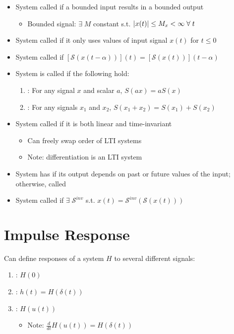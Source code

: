 \documentclass[12pt]{extarticle}
\begin{document}
\newp
\begin{whitebox}
     \begin{itemize}
        \item System called  if a bounded input results in a bounded output \begin{itemize}
            \item Bounded signal: $\exists\;M$ constant s.t. $\left|x(t)\right|\leq M_x<\infty\;\forall\;t$
        \end{itemize}
        \item System called  if it only uses values of input signal $x(t)$ for $t\leq0$
        \item System called  if $[\mathcal{S}(x(t-\alpha))](t)=[\mathcal{S}(x(t))](t-\alpha)$
        \item System is called  if the following hold: \begin{enumerate}
            \item {}: For any signal $x$ and scalar $a$, $S(ax)=aS(x)$
            \item {}: For any signals $x_1$ and $x_2$, $S(x_1+x_2)=S(x_1)+S(x_2)$
        \end{enumerate}
        \item System called  if it is both linear and time-invariant \begin{itemize}
            \item Can freely swap order of LTI systems
            \item Note: differentiation is an LTI system
        \end{itemize}
        \item System has  if its output depends on past or future values of the input; otherwise, called 
        \item System called  if $\exists\;\mathcal{S}^{inv}$ s.t. $x(t)=\mathcal{S}^{inv}(\mathcal{S}(x(t)))$
    \end{itemize}
\end{whitebox}


\pagebreak
\section{Impulse Response}
Can define responses of a system $H$ to several different signals: \begin{enumerate}
    \item {}: $H(0)$
    \item {}: $h(t)=H(\delta(t))$
    \item {}: $H(u(t))$ \begin{itemize}
        \item Note: $\frac{d}{dt}H(u(t))=H(\delta(t))$
    \end{itemize}
\end{enumerate}
\end{document}
